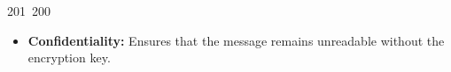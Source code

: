 201~200~\documentclass{article}
\begin{document}
\begin{itemize}
	                                                                                                                                                                                                                                                                                                	                                                                                                                                        	    	                                                                                                	                                                                                                                                                                                                                                                                                                                                	                                                                        	                                                                        	                                                                                                                                        	                                                                                                                                                                                                                        	                                                                                                                            	                                                                	                                                                                                                                                                                        \item \textbf{Confidentiality:} Ensures that the message remains unreadable without the encryption key.

\end{itemize}
\end{document}
